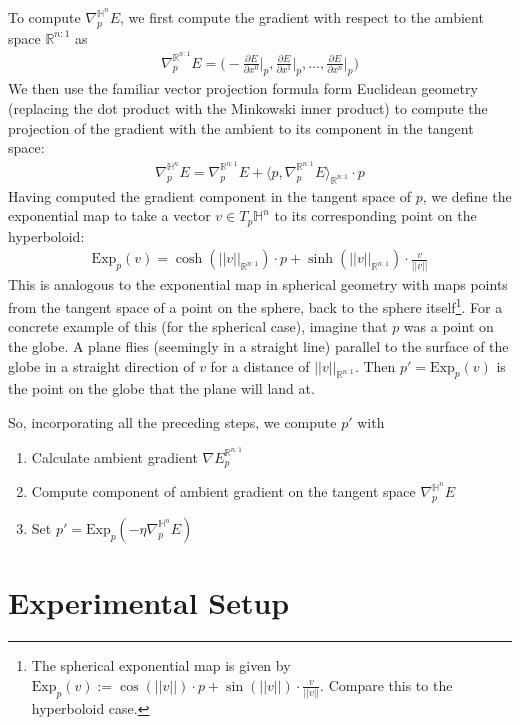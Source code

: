 \documentclass{article}
\begin{document}
To compute $\nabla^{\mathbb{H}^n}_p E$, we first compute the gradient with respect to the ambient space $\mathbb{R}^{n:1}$ as
\begin{align*}
\nabla_p^{\mathbb{R}^{n:1}} E = \Bigg(-\frac{\partial E}{\partial x^0}\bigg|_p, \frac{\partial E}{\partial x^1}\bigg|_p, ..., \frac{\partial E}{\partial x^n}\bigg|_p\Bigg)
\end{align*}
We then use the familiar vector projection formula form Euclidean geometry (replacing the dot product with the Minkowski inner product) to compute the projection of the gradient with the ambient to its component in the tangent space:
\begin{align*}
\nabla^{\mathbb{H}^n}_p E = \nabla^{\mathbb{R}^{n:1}}_p E + \langle p, \nabla^{\mathbb{R}^{n:1}}_p E  \rangle_{\mathbb{R}^{n:1}} \cdot p
\end{align*}
Having computed the gradient component in the tangent space of $p$, we define the exponential map to take a vector $v \in T_p \mathbb{H}^n$ to its corresponding point on the hyperboloid:
\begin{align*}
\text{Exp}_p(v) = \cosh(||v||_{\mathbb{R}^{n:1}}) \cdot p + \sinh(||v||_{\mathbb{R}^{n:1}}) \cdot \frac{v}{||v||}  
\end{align*}
This is analogous to the exponential map in spherical geometry with maps points from the tangent space of a point on the sphere, back to the sphere itself\footnote{The spherical exponential map is given by $\text{Exp}_p(v) := \cos(||v||) \cdot p + \sin(||v||) \cdot \frac{v}{||v||} $. Compare this to the hyperboloid case.}.
For a concrete example of this (for the spherical case), imagine that $p$ was a point on the globe. 
A plane flies (seemingly in a straight line) parallel to the surface of the globe in a straight direction of $v$ for a distance of $||v||_{\mathbb{R}^{n:1}}$.
Then $p'=\text{Exp}_p(v)$ is the point on the globe that the plane will land at.

So, incorporating all the preceding steps, we compute $p'$ with 
\begin{enumerate}
	\item Calculate ambient gradient $\nabla E_p^{\mathbb{R}^{n:1}}$
	\item Compute component of ambient gradient on the tangent space $\nabla^{\mathbb{H}^n}_p E$
	\item Set $p'=\text{Exp}_p\left(-\eta \nabla^{\mathbb{H}^n}_p E\right)$
\end{enumerate}
\section{Experimental Setup}
\end{document}
